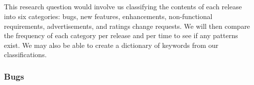 \documentclass{acm_proc_article-sp}
\begin{document}
\begin{center}

\label{tab:sumcycles}
\end{center}

\begin{center}

\label{tab:cycles}
\end{center}


\subsection{\RQThree }
This research question would involve us classifying the contents of each release into six categories: bugs, new features, enhancements, non-functional requirements, advertisements, and ratings change requests.
We will then compare the frequency of each category per release and per time to see if any patterns exist.
We may also be able to create a dictionary of keywords from our classifications.

\subsubsection{Bugs}


\begin{center}

\label{tab:bugs}
\end{center}

\begin{center}

\label{tab:sumBugs}
\end{center}
\end{document}
